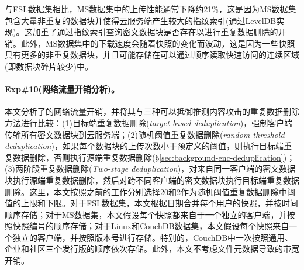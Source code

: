 与FSL数据集相比，MS数据集中的上传性能通常下降约21\%，这是因为MS数据集包含大量非重复的数据块并使得云服务端产生较大的指纹索引(通过LevelDB\cite{leveldb}实现)。这加重了通过指纹索引查询密文数据块是否存在以进行重复数据删除的开销。此外，MS数据集中的下载速度会随着快照的变化而波动，这是因为一些快照具有更多的非重复数据块，并且可能存储在可以通过顺序读取快速访问的连续区域(即数据块碎片较少\cite{lillibridge13})中。

\paragraph*{Exp\#10(网络流量开销分析)。}
本文分析了\prototype 的网络流量开销，并将其与三种可以抵御推测内容攻击的重复数据删除方法进行比较：(1)目标端重复数据删除(\textit{target-based deduplication})\cite{harnik2010side}，强制客户端传输所有密文数据块到云服务端；(2)随机阈值重复数据删除(\textit{random-threshold deduplication})\cite{harnik2010side}，如果每个数据块的上传次数小于预定义的阈值，则执行目标端重复数据删除，否则执行源端重复数据删除(\S\ref{sec:background-enc-deduplication})；(3)两阶段重复数据删除(\textit{Two-stage deduplication})\cite{li15}，对来自同一客户端的密文数据块执行源端重复数据删除，然后对跨不同客户端的密文数据块执行目标端重复数据删除。这里，本文按照之前的工作\cite{harnik2010side}分别选择20和2作为随机阈值重复数据删除中阈值的上限和下限。对于FSL数据集，本文根据日期合并每个用户的快照，并按时间顺序存储；对于MS数据集，本文假设每个快照都来自于一个独立的客户端，并按照快照编号的顺序存储；对于Linux和CouchDB数据集，本文假设每个快照来自一个独立的客户端，并按照版本号进行存储。特别的，CouchDB中一次按照通用、企业和社区三个发行版的顺序依次存储。此外，本文不考虑文件元数据导致的带宽开销。

